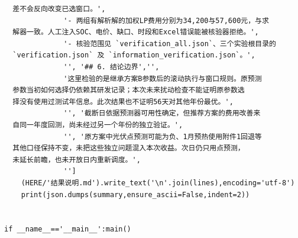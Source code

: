 \begin{verbatim}
  差不会反向改变已选窗口。',
              '- 两组有解析解的加权LP费用分别为34,200与57,600元，与求
  解器一致。人工注入SOC、电价、缺口、时段和Excel错误能被核验器拒绝。',
              '- 核验范围见 `verification_all.json`、三个实验根目录的
  `verification.json` 及 `information_verification.json`。',
              '', '## 6. 结论边界','',
              '这里检验的是继承方案B参数后的滚动执行与窗口规则。原预测
  参数当初如何选择仍依赖其研发记录；本次未来扰动检查不能证明原参数选
  择没有使用过测试年信息。此次结果也不证明56天对其他年份最优。',
              '', '截断日依据预测器可用性确定，但推荐方案的费用改善来
  自同一年度回测，尚未经过另一个年份的独立验证。',
              '', '原方案中光伏点预测可能为负、1月预热使用附件1回退等
  其他口径保持不变，未把这些独立问题混入本次收益。次日仍只用点预测，
  未延长前瞻，也未开放日内重新调度。',
              '']
    (HERE/'结果说明.md').write_text('\n'.join(lines),encoding='utf-8')
    print(json.dumps(summary,ensure_ascii=False,indent=2))


if __name__=='__main__':main()
\end{verbatim}

